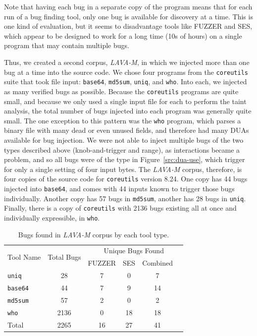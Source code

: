 Note that having each bug in a separate copy of the program means that for each run of a bug finding tool, only one bug is available for discovery at a time.  
This is one kind of evaluation, but it seems to disadvantage tools like FUZZER and SES, which appear to be designed to work for a long time (10s of hours) on a single program that may contain multiple bugs. 

Thus, we created a second corpus, \emph{LAVA-M}, in which we injected more than one bug at a time into the source code.
We chose four programs from the \verb+coreutils+ suite that took file input: \verb+base64+, \verb+md5sum+, \verb+uniq+, and \verb+who+.
Into each, we injected as many verified bugs as possible.
Because the \verb+coreutils+ programs are quite small, and because we only used a single input file for each to perform the taint analysis, the total number of bugs injected into each program was generally quite small.
The one exception to this pattern was the \verb+who+ program, which parses a binary file with many dead or even unused fields, and therefore had many DUAs available for bug injection.
We were not able to inject multiple bugs of the two types described above (knob-and-trigger and range), as interactions became a problem, and so all bugs were of the type in Figure~\ref{src:dua-use}, which trigger for only a single setting of four input bytes.  
The \emph{LAVA-M} corpus, therefore, is four copies of the source code for \verb+coreutils+ version 8.24.
One copy has 44 bugs injected into \verb+base64+, and comes with 44 inputs known to trigger those bugs individually.
Another copy has 57 bugs in \verb+md5sum+, another has 28 bugs in \verb+uniq+.
Finally, there is a copy of \verb+coreutils+ with 2136 bugs existing all at once and individually expressible, in \verb+who+.


\begin{table}[h]
\centering
\begin{tabular}{l|c|c|c|c|c} 
\multirow{2}{*}{Tool Name} & \multirow{2}{*}{Total Bugs} & \multicolumn{4}{c}{Unique Bugs Found} \\
              &            & FUZZER       & SES     & Combined \\ \hline 
\verb+uniq+   &    28      & 7                 & 0          & 7               \\
\verb+base64+ &    44      & 7              & 9          & 14               \\
\verb+md5sum+ &    57      & 2             & 0          & 2               \\
\verb+who+    &    2136    & 0              & 18          & 18               \\
Total         &     2265      & 16                 & 27          & 41               \\
\end{tabular}
\caption{Bugs found in \emph{LAVA-M} corpus by each tool type.}
\label{table:tool-eval-results-coreutils}
\end{table}

